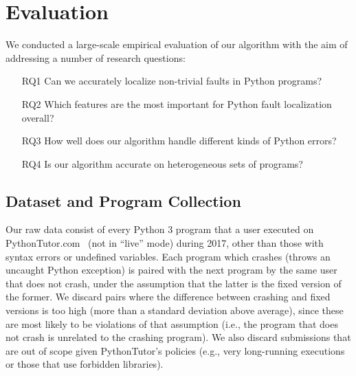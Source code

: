 \documentclass[conference]{IEEEtran}
\begin{document}


\section{Evaluation}
\label{sec-eval}

We conducted a large-scale empirical evaluation of our algorithm with the
aim of addressing a number of research questions:
\begin{enumerate}

\item[RQ1]{Can we accurately localize non-trivial faults in Python
programs?}

\item[RQ2]{Which features are the most important for Python fault
localization overall?}


\item[RQ3]{How well does our algorithm handle different kinds of Python errors?}

\item[RQ4]{Is our algorithm accurate on heterogeneous sets of programs?}

\end{enumerate}

\subsection{Dataset and Program Collection}

Our raw data consist of every Python 3 program that a user executed on
PythonTutor.com~\cite{Guo2013-vu} (not in ``live'' mode) during 2017, other
than those with syntax errors or undefined variables.  Each program which
crashes (throws an uncaught Python exception) is paired with the next
program by the same user that does not crash, under the assumption that
the latter is the fixed version of the former. We discard pairs where the
difference between crashing and fixed versions is too high (more than a
standard deviation above average), since these are most likely to be violations of that
assumption (i.e., the program that does not crash is unrelated to the
crashing program). We also discard submissions that are out of scope given
PythonTutor's policies (e.g., very long-running executions or those that
use forbidden libraries).
\end{document}
